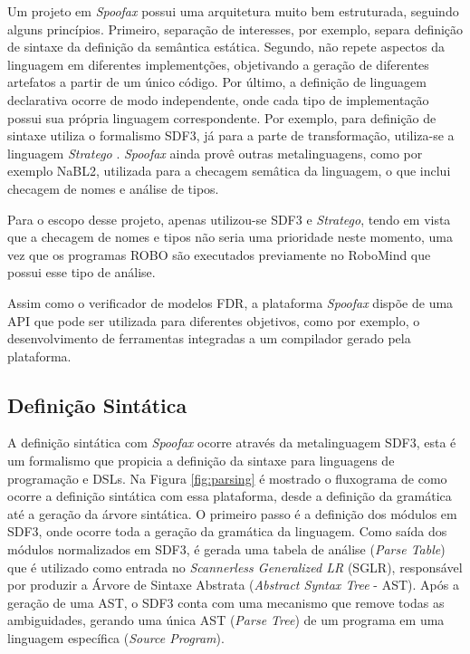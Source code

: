 Um projeto em \textit{Spoofax} possui uma arquitetura muito bem estruturada, seguindo alguns princípios. Primeiro, separação de interesses, por exemplo, separa definição de sintaxe da definição da semântica estática. Segundo, não repete aspectos da linguagem em diferentes implementções, objetivando a geração de diferentes artefatos a partir de um único código. Por último, a definição de linguagem declarativa ocorre de modo independente, onde cada tipo de implementação possui sua própria linguagem correspondente. Por exemplo, para definição de sintaxe utiliza o formalismo SDF3, já para a parte de transformação, utiliza-se a linguagem \textit{Stratego} \cite{KatsSpoofax}. \textit{Spoofax} ainda provê outras metalinguagens, como por exemplo NaBL2, utilizada para a checagem semâtica da linguagem, o que inclui checagem de nomes e análise de tipos. 

Para o escopo desse projeto, apenas utilizou-se SDF3 e \textit{Stratego}, tendo em vista que a checagem de nomes e tipos não seria uma prioridade neste momento, uma vez que os programas ROBO são executados previamente no RoboMind que possui esse tipo de análise.

Assim como o verificador de modelos FDR, a plataforma \textit{Spoofax} dispõe de uma API que pode ser utilizada para diferentes objetivos, como por exemplo, o desenvolvimento de ferramentas integradas a um compilador gerado pela plataforma.

\subsection{Definição Sintática}

A definição sintática com \textit{Spoofax} ocorre através da metalinguagem SDF3, esta é um formalismo que propicia a definição da sintaxe para linguagens de programação e DSLs. Na Figura \ref{fig:parsing} é mostrado o fluxograma de como ocorre a definição sintática com essa plataforma, desde a definição da gramática até a geração da árvore sintática. O primeiro passo é a definição dos módulos em SDF3, onde ocorre toda a geração da gramática da linguagem. Como saída dos módulos normalizados em SDF3, é gerada uma tabela de análise (\textit{Parse Table}) que é utilizado como entrada no \textit{Scannerless Generalized LR} (SGLR), responsável por produzir a Árvore de Sintaxe Abstrata (\textit{Abstract Syntax Tree} - AST). Após a geração de uma AST, o SDF3 conta com uma mecanismo que remove todas as ambiguidades, gerando uma única AST (\textit{Parse Tree}) de um programa em uma linguagem específica (\textit{Source Program}). 

